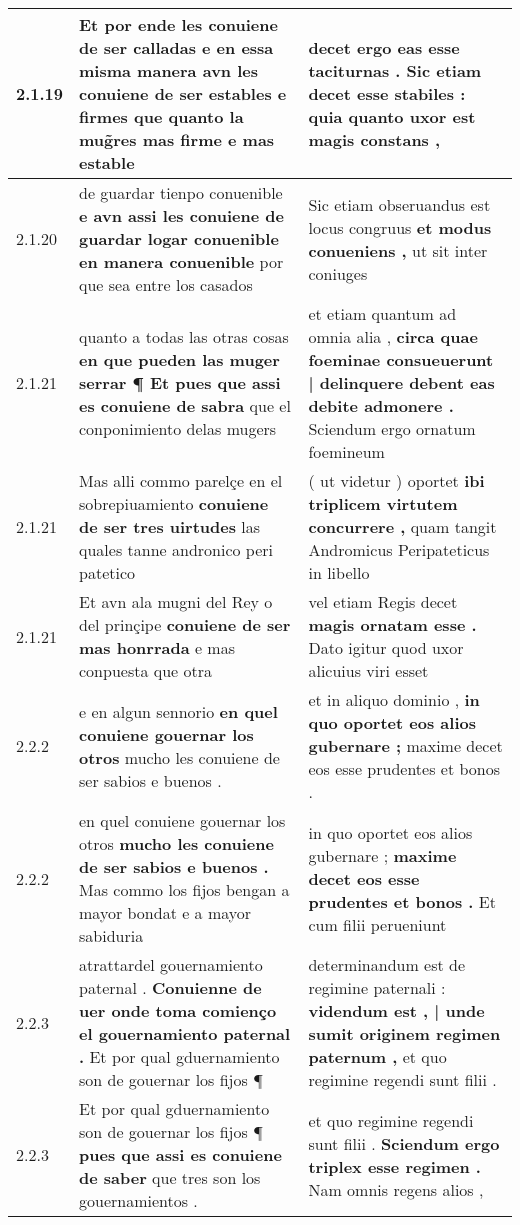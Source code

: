 \begin{tabular}{|p{1cm}|p{6.5cm}|p{6.5cm}|}
2.1.19 & Et por ende les conuiene de ser calladas \textbf{ e en essa misma manera avn les conuiene de ser estables e firmes } que quanto la mug̃res mas firme e mas estable & decet ergo eas esse taciturnas . \textbf{ Sic etiam decet esse stabiles : } quia quanto uxor est magis constans , \\\hline
2.1.20 & de guardar tienpo conuenible \textbf{ e avn assi les conuiene de guardar logar conuenible en manera conuenible } por que sea entre los casados & Sic etiam obseruandus est locus congruus \textbf{ et modus conueniens , } ut sit inter coniuges \\\hline
2.1.21 & quanto a todas las otras cosas \textbf{ en que pueden las muger serrar ¶ Et pues que assi es conuiene de sabra } que el conponimiento delas mugers & et etiam quantum ad omnia alia , \textbf{ circa quae foeminae consueuerunt | delinquere debent eas debite admonere . } Sciendum ergo ornatum foemineum \\\hline
2.1.21 & Mas alli commo parelçe en el sobrepiuamiento \textbf{ conuiene de ser tres uirtudes } las quales tanne andronico peri patetico & ( ut videtur ) oportet \textbf{ ibi triplicem virtutem concurrere , } quam tangit Andromicus Peripateticus in libello \\\hline
2.1.21 & Et avn ala mugni del Rey o del prinçipe \textbf{ conuiene de ser mas honrrada } e mas conpuesta que otra & vel etiam Regis decet \textbf{ magis ornatam esse . } Dato igitur quod uxor alicuius viri esset \\\hline
2.2.2 & e en algun sennorio \textbf{ en quel conuiene gouernar los otros } mucho les conuiene de ser sabios e buenos . & et in aliquo dominio , \textbf{ in quo oportet eos alios gubernare ; } maxime decet eos esse prudentes et bonos . \\\hline
2.2.2 & en quel conuiene gouernar los otros \textbf{ mucho les conuiene de ser sabios e buenos . } Mas commo los fijos bengan a mayor bondat e a mayor sabiduria & in quo oportet eos alios gubernare ; \textbf{ maxime decet eos esse prudentes et bonos . } Et cum filii perueniunt \\\hline
2.2.3 & atrattardel gouernamiento paternal . \textbf{ Conuienne de uer onde toma comienço el gouernamiento paternal . } Et por qual gduernamiento son de gouernar los fijos ¶ & determinandum est de regimine paternali : \textbf{ videndum est , | unde sumit originem regimen paternum , } et quo regimine regendi sunt filii . \\\hline
2.2.3 & Et por qual gduernamiento son de gouernar los fijos ¶ \textbf{ pues que assi es conuiene de saber } que tres son los gouernamientos . & et quo regimine regendi sunt filii . \textbf{ Sciendum ergo triplex esse regimen . } Nam omnis regens alios , \\\hline

\end{tabular}

